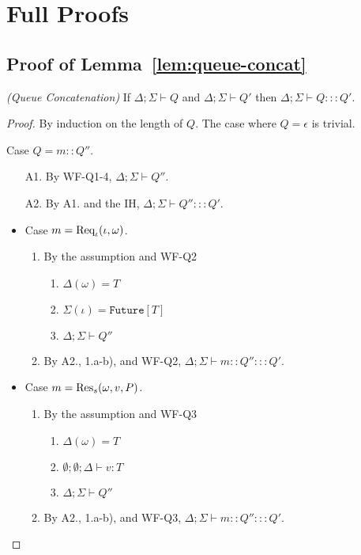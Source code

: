 \section{Full Proofs}

\subsection{Proof of Lemma~\ref{lem:queue-concat}}\label{app:queue-concat}

\begin{lemmaun}
\emph{(Queue Concatenation)}
If $\Delta ; \Sigma \vdash Q$ and $\Delta ; \Sigma \vdash Q'$ then $\Delta ; \Sigma \vdash Q ::: Q'$.
\end{lemmaun}
\begin{proof}
By induction on the length of $Q$. The case where $Q = \epsilon$ is trivial.

Case $Q = m :: Q''$.
\begin{enumerate}
\item[A1.] By WF-Q1-4, $\Delta ; \Sigma \vdash Q''$.
\item[A2.] By A1. and the IH, $\Delta ; \Sigma \vdash Q'' ::: Q'$.
\end{enumerate}

\begin{itemize}
\item Case $m = {\textrm{Req}_{\iota}(\iota, \omega)}$.
\begin{enumerate}
\item By the assumption and WF-Q2
  \begin{enumerate}[label=(\alph*)]
  \item $\Delta(\omega) = T$
  \item $\Sigma(\iota) = \texttt{Future}[T]$
  \item $\Delta ; \Sigma \vdash Q''$
  \end{enumerate}
\item By A2., 1.a-b), and WF-Q2, $\Delta ; \Sigma \vdash m :: Q'' ::: Q'$.
\end{enumerate}

\item Case $m = {\textrm{Res}_s(\omega, v, P)}$.
\begin{enumerate}
\item By the assumption and WF-Q3
  \begin{enumerate}[label=(\alph*)]
  \item $\Delta(\omega) = T$
  \item $\emptyset ; \emptyset ; \Delta \vdash v : T$
  \item $\Delta ; \Sigma \vdash Q''$
  \end{enumerate}
\item By A2., 1.a-b), and WF-Q3, $\Delta ; \Sigma \vdash m :: Q'' ::: Q'$.
\end{enumerate}


\end{itemize}
\end{proof}
